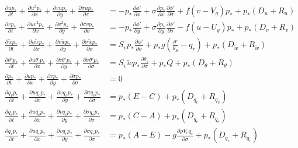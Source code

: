 \begin{subequations}\label{eq:progn0}
\begin{align}
\frac{\partial{up_*}}{\partial{t}} + \frac{\partial{u^2p_*}}{\partial{x}}+ \frac{\partial{vup_*}}{\partial{y}}+ \frac{\partial{\dot{\sigma}up_*}}{\partial{\sigma}}&=-p_* \frac{\partial{\phi'}}{\partial{x}}+\sigma \frac{\partial{p_*}}{\partial{x}}\frac{\partial{\phi'}}{\partial{\sigma}}+f(v-V_g )p_*+p_*(D_u+R_u )\label{eq:progn1} \\
\frac{\partial{vp_*}}{\partial{t}} + \frac{\partial{uv^2p_*}}{\partial{x}}+ \frac{\partial{v^2p_*}}{\partial{y}}+ \frac{\partial{\dot{\sigma}vp_*}}{\partial{\sigma}}&=-p_* \frac{\partial{\phi'}}{\partial{y}}+\sigma \frac{\partial{p_*}}{\partial{y}}\frac{\partial{\phi'}}{\partial{\sigma}}-f(u-U_g )p_*+p_*(D_v+R_v )\label{eq:progn2} \\
\frac{\partial{\tilde{w}p_*}}{\partial{t}} + \frac{\partial{u\tilde{w}p_*}}{\partial{x}}+ \frac{\partial{v\tilde{w}p_*}}{\partial{y}}+ \frac{\partial{\dot{\sigma}\tilde{w}p_*}}{\partial{\sigma}}&=S_vp_*\frac{\partial{\phi'}}{\partial{\sigma}}+p_*g(\frac{\theta'}{\theta_S}-q_r)+p_*(D_{\tilde{w}}+R_{\tilde{w}})\label{eq:progn3} \\
\frac{\partial{\theta'p_*}}{\partial{t}} + \frac{\partial{u\theta'p_*}}{\partial{x}}+ \frac{\partial{v\theta'p_*}}{\partial{y}}+ \frac{\partial{\dot{\sigma}\theta'p_*}}{\partial{\sigma}}&=S_v\tilde{w}p_* \frac{\partial{\theta_s}}{\partial{\sigma}}+p_*Q+p_*(D_{\theta}+R_{\theta})\label{eq:progn4} \\
\frac{\partial{p_*}}{\partial{t}} + \frac{\partial{up_*}}{\partial{x}}+ \frac{\partial{vp_*}}{\partial{y}}+ \frac{\partial{\dot{\sigma}p_*}}{\partial{\sigma}}&=0\label{eq:progn5} \\
\frac{\partial{q_vp_*}}{\partial{t}} + \frac{\partial{uq_vp_*}}{\partial{x}}+ \frac{\partial{vq_vp_*}}{\partial{y}}+ \frac{\partial{\dot{\sigma}q_vp_*}}{\partial{\sigma}}&=p_*(E-C)+p_*(D_{q_v}+R_{q_v})\label{eq:progn6} \\
\frac{\partial{q_cp_*}}{\partial{t}} + \frac{\partial{uq_cp_*}}{\partial{x}}+ \frac{\partial{vq_cp_*}}{\partial{y}}+ \frac{\partial{\dot{\sigma}q_cp_*}}{\partial{\sigma}}&=p_*(C-A)+p_*(D_{q_c}+R_{q_c})\label{eq:progn7} \\
\frac{\partial{q_rp_*}}{\partial{t}} + \frac{\partial{uq_rp_*}}{\partial{x}}+ \frac{\partial{vq_rp_*}}{\partial{y}}+ \frac{\partial{\dot{\sigma}q_rp_*}}{\partial{\sigma}}&=p_*(A-E)-g\frac{\partial{\rho V_rq_r}}{\partial\sigma}+p_*(D_{q_r}+R_{q_r})\label{eq:progn8}
\end{align}
\end{subequations}
